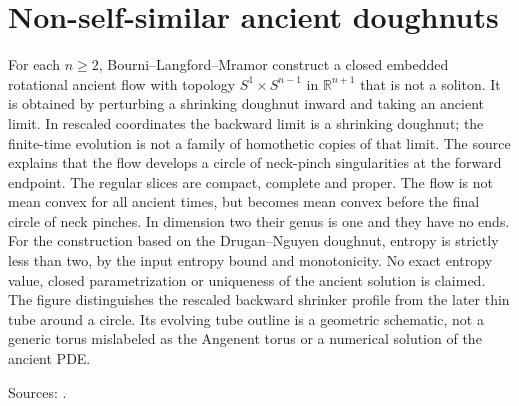 \chapter{Non-self-similar ancient doughnuts}\label{sec:catalogue-ancient-doughnuts}
\begin{example}\label{ex:catalogue-ancient-doughnuts}
For each $n\ge2$, Bourni--Langford--Mramor construct a closed embedded rotational ancient flow with topology $S^1\times S^{n-1}$ in $\mathbb R^{n+1}$ that is not a soliton. It is obtained by perturbing a shrinking doughnut inward and taking an ancient limit. In rescaled coordinates the backward limit is a shrinking doughnut; the finite-time evolution is not a family of homothetic copies of that limit. The source explains that the flow develops a circle of neck-pinch singularities at the forward endpoint.
The regular slices are compact, complete and proper. The flow is not mean convex for all ancient times, but becomes mean convex before the final circle of neck pinches. In dimension two their genus is one and they have no ends. For the construction based on the Drugan--Nguyen doughnut, entropy is strictly less than two, by the input entropy bound and monotonicity. No exact entropy value, closed parametrization or uniqueness of the ancient solution is claimed. The figure distinguishes the rescaled backward shrinker profile from the later thin tube around a circle. Its evolving tube outline is a geometric schematic, not a generic torus mislabeled as the Angenent torus or a numerical solution of the ancient PDE.
\par Sources: \cite{CatBourniLangfordMramor2020}.
\end{example}

